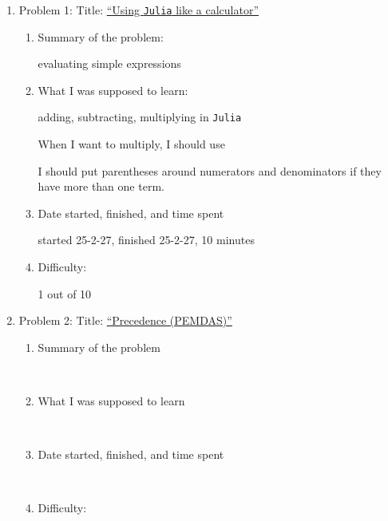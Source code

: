 \documentclass[12pt,answers]{book}
\newcommand{\eb}{\begin{tcolorbox}[width=0.90\textwidth, height=4cm, colback=white]
    ~
  \end{tcolorbox}}
\newcommand{\ebb}{\begin{tcolorbox}[width=0.90\textwidth, height=9cm, colback=white]
    ~
  \end{tcolorbox}}
\newcommand{\ebbb}{\begin{tcolorbox}[width=0.90\textwidth, height=2cm, colback=white]
    ~
    \end{tcolorbox}}
\newcommand{\ebbbb}{\begin{tcolorbox}[width=0.90\textwidth, height=1cm, colback=white]
    ~
    \end{tcolorbox}}
\begin{document}
\begin{enumerate}
  \item Problem 1: \hspace{2cm} Title: \underline{``Using {\tt Julia} like a calculator''}
  \begin{enumerate}
  \item Summary of the problem:
    \begin{tcolorbox}[height=2cm]
           evaluating simple expressions \vspace{1cm}
    \end{tcolorbox}
     \item What I was supposed to learn:
     \begin{tcolorbox}[height=5cm]
      adding, subtracting, multiplying in {\tt Julia}
      \vspace{1cm}

      When I want to multiply, I should use \textasteriskcentered\vspace{1cm}

      I should put parentheses around numerators and denominators if they have more than one term.
    \end{tcolorbox}

  \item Date started, finished, and time spent
    \begin{tcolorbox}[height=1cm]
          started 25-2-27, finished 25-2-27, 10 minutes\vspace{1cm}
    \end{tcolorbox}


  \item Difficulty:
    \begin{tcolorbox}[height=1cm]
      1 out of 10
    \end{tcolorbox}

  \end{enumerate}

\clearpage
\item Problem 2: \hspace{2cm} Title: \underline{``Precedence (PEMDAS)''}
  \begin{enumerate}
  \item Summary of the problem \eb
  \item What I was supposed to learn \ebb
  \item Date started, finished, and time spent \ebbb
  \item Difficulty: \ebbbb
  \end{enumerate}


\end{enumerate}
\end{document}

